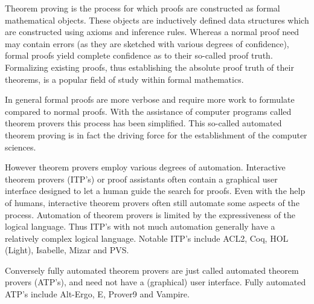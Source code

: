 Theorem proving is the process for which proofs are constructed as formal mathematical objects.
These objects are inductively defined data structures which are constructed using axioms and inference rules.
Whereas a normal proof need may contain errors (as they are sketched with various degrees of confidence),
formal proofs yield complete confidence as to their so-called proof truth.
Formalizing existing proofs, thus establishing the absolute proof truth of their theorems, is a popular field of study within formal mathematics.

In general formal proofs are more verbose and require more work to formulate compared to normal proofs.
With the assistance of computer programs called theorem provers this process has been simplified.
This so-called automated theorem proving is in fact the driving force for the establishment of the computer sciences.

However theorem provers employ various degrees of automation.
Interactive theorem provers (ITP's) or proof assistants often contain a graphical user interface designed to let a human guide the search for proofs.
Even with the help of humans, interactive theorem provers often still automate some aspects of the process.
Automation of theorem provers is limited by the expressiveness of the logical language.
Thus ITP's with not much automation generally have a relatively complex logical language.
Notable ITP's include ACL2, Coq, HOL (Light), Isabelle, Mizar and PVS.

Conversely fully automated theorem provers are just called automated theorem provers (ATP's), and need not have a (graphical) user interface.
Fully automated ATP's include Alt-Ergo, E, Prover9 and Vampire.

